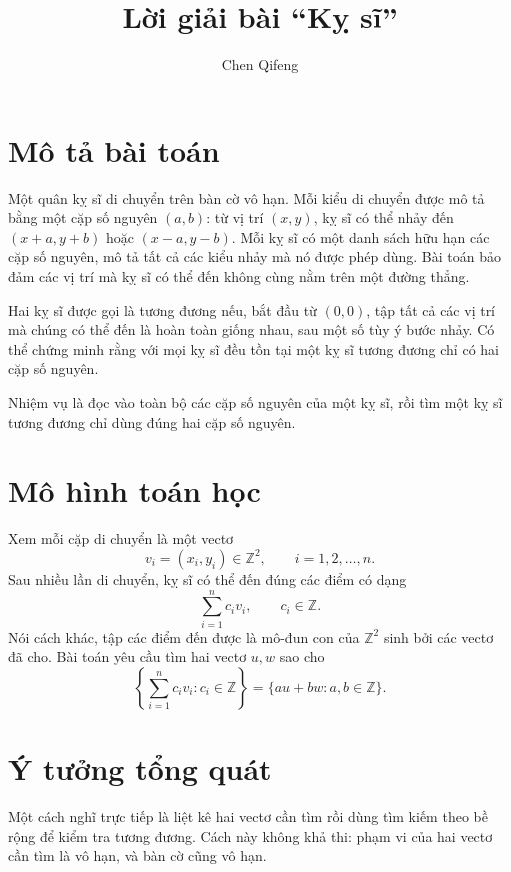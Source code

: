 \documentclass[11pt]{article}
\title{Lời giải bài ``Kỵ sĩ''}
\author{Chen Qifeng}
\date{}
\begin{document}
\maketitle


\section{Mô tả bài toán}

Một quân kỵ sĩ di chuyển trên bàn cờ vô hạn. Mỗi kiểu di chuyển được mô tả
bằng một cặp số nguyên \((a,b)\): từ vị trí \((x,y)\), kỵ sĩ có thể nhảy đến
\((x+a,y+b)\) hoặc \((x-a,y-b)\). Mỗi kỵ sĩ có một danh sách hữu hạn các cặp
số nguyên, mô tả tất cả các kiểu nhảy mà nó được phép dùng. Bài toán bảo đảm
các vị trí mà kỵ sĩ có thể đến không cùng nằm trên một đường thẳng.

Hai kỵ sĩ được gọi là tương đương nếu, bắt đầu từ \((0,0)\), tập tất cả các
vị trí mà chúng có thể đến là hoàn toàn giống nhau, sau một số tùy ý bước
nhảy. Có thể chứng minh rằng với mọi kỵ sĩ đều tồn tại một kỵ sĩ tương đương
chỉ có hai cặp số nguyên.

Nhiệm vụ là đọc vào toàn bộ các cặp số nguyên của một kỵ sĩ, rồi tìm một kỵ
sĩ tương đương chỉ dùng đúng hai cặp số nguyên.

\section{Mô hình toán học}

Xem mỗi cặp di chuyển là một vectơ
\[
  v_i=(x_i,y_i)\in\mathbb{Z}^2,\qquad i=1,2,\ldots,n.
\]
Sau nhiều lần di chuyển, kỵ sĩ có thể đến đúng các điểm có dạng
\[
  \sum_{i=1}^{n} c_i v_i,\qquad c_i\in\mathbb{Z}.
\]
Nói cách khác, tập các điểm đến được là mô-đun con của \(\mathbb{Z}^2\) sinh
bởi các vectơ đã cho. Bài toán yêu cầu tìm hai vectơ \(u,w\) sao cho
\[
  \left\{\sum_{i=1}^{n} c_i v_i:c_i\in\mathbb{Z}\right\}
  =
  \{au+bw:a,b\in\mathbb{Z}\}.
\]

\section{Ý tưởng tổng quát}

Một cách nghĩ trực tiếp là liệt kê hai vectơ cần tìm rồi dùng tìm kiếm theo
bề rộng để kiểm tra tương đương. Cách này không khả thi: phạm vi của hai vectơ
cần tìm là vô hạn, và bàn cờ cũng vô hạn.
\end{document}
